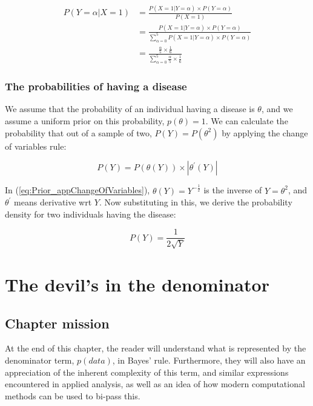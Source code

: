 \documentclass[11pt,fullpage]{book}
\begin{document}
\begin{align}\label{eq:Prior_bayesDiscreteForm}
P(Y=\alpha|X=1) &= \frac{P(X=1|Y=\alpha)\times P(Y=\alpha)}{P(X=1)}\\
&= \frac{P(X=1|Y=\alpha)\times P(Y=\alpha)}{\sum\limits_{\alpha=0}^{5}P(X=1|Y=\alpha)\times P(Y=\alpha)}\\
&= \frac{\frac{\alpha}{5}\times \frac{1}{6}}{\sum\limits_{\alpha=0}^{5}\frac{\alpha}{5}\times\frac{1}{6}}
\end{align}

\subsection{The probabilities of having a disease}\label{app:Prior_diseaseJeffreys}
We assume that the probability of an individual having a disease is $\theta$, and we assume a uniform prior on this probability, $p(\theta)=1$. We can calculate the probability that out of a sample of two, $P(Y)=P(\theta^2)$ by applying the change of variables rule:

\begin{equation}\label{eq:Prior_appChangeOfVariables}
P(Y) = P(\theta(Y))\times |\theta^\prime(Y)|
\end{equation}

In (\ref{eq:Prior_appChangeOfVariables}), $\theta(Y)=Y^{-\frac{1}{2}}$ is the inverse of $Y=\theta^2$, and $\theta^\prime$ means derivative wrt $Y$. Now substituting in this, we derive the probability density for two individuals having the disease:

\begin{equation}\label{eq:Prior_appChangeOfVariablesSolved}
P(Y) = \frac{1}{2\sqrt{Y}}
\end{equation}


\chapter{The devil's in the denominator}\label{chap:denominator}
\section{Chapter mission}
At the end of this chapter, the reader will understand what is represented by the denominator term, $p(data)$, in Bayes' rule. Furthermore, they will also have an appreciation of the inherent complexity of this term, and similar expressions encountered in applied analysis, as well as an idea of how modern computational methods can be used to bi-pass this.
\end{document}

